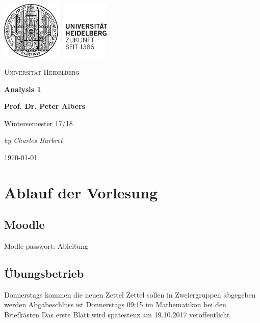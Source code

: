 \documentclass[12pt,a4paper]{article} %
\begin{document}
	\begin{titlepage} %
		\centering
		\includegraphics[width=0.40\textwidth]{UniLogo}\par\vspace{1cm}
		{\scshape\LARGE Universität Heidelberg \par}
		\vspace{1cm}
		{\Huge\bfseries Analysis 1 \par}
		\vspace{1cm}
		{\LARGE\bfseries Prof. Dr. Peter Albers \par}
		\vspace{1cm}
		{\huge Wintersemester 17/18 \par}
		\vspace{2cm}
		{\Large\itshape by Charles Barbret \par}
		
		\vfill
		
		{\large \gerDate\today\par}
	\end{titlepage}
	
	\tableofcontents %
	\newpage %
	\setcounter{section}{-1}
	\section{Ablauf der Vorlesung}
	\subsection{Moodle}
	Modle passwort: Ableitung
	\subsection{Übungsbetrieb}
	Donnerstags kommen die neuen Zettel \newline
	Zettel sollen in Zweiergruppen abgegeben werden \newline
	Abgabeschluss ist Donnerstags 09:15 im Mathematikon bei den Briefkästen \newline
	Das erste Blatt wird spätestenz am 19.10.2017 veröffentlicht 
	
\end{document}
